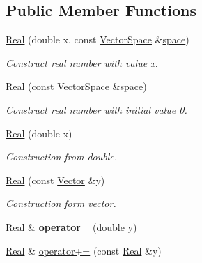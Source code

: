 \subsection*{Public Member Functions}
\begin{DoxyCompactItemize}
\item 
\hyperlink{classSpacy_1_1Real_a7c8581cf79ac0d3ffdc31179d31d8e30}{Real} (double x, const \hyperlink{classSpacy_1_1VectorSpace}{Vector\+Space} \&\hyperlink{classSpacy_1_1VectorBase_aa999dbf9d679d895dfe04c10fbf9f5e9}{space})
\begin{DoxyCompactList}\small\item\em Construct real number with value x. \end{DoxyCompactList}\item 
\hyperlink{classSpacy_1_1Real_a5ae2b93ceddb594b142b3706e4cc9c83}{Real} (const \hyperlink{classSpacy_1_1VectorSpace}{Vector\+Space} \&\hyperlink{classSpacy_1_1VectorBase_aa999dbf9d679d895dfe04c10fbf9f5e9}{space})
\begin{DoxyCompactList}\small\item\em Construct real number with initial value 0. \end{DoxyCompactList}\item 
\hyperlink{classSpacy_1_1Real_ad0f157978475b3c9942a1bcdceb41ab0}{Real} (double x)
\begin{DoxyCompactList}\small\item\em Construction from double. \end{DoxyCompactList}\item 
\hyperlink{classSpacy_1_1Real_a2f9408a9cf34d8119139c73ddda83cc5}{Real} (const \hyperlink{classSpacy_1_1Vector}{Vector} \&y)
\begin{DoxyCompactList}\small\item\em Construction form vector. \end{DoxyCompactList}\item 
\hypertarget{classSpacy_1_1Real_a2c90e84d6c6732b6812d371b7ccf3a18}{}\hyperlink{classSpacy_1_1Real}{Real} \& {\bfseries operator=} (double y)\label{classSpacy_1_1Real_a2c90e84d6c6732b6812d371b7ccf3a18}

\item 
\hypertarget{classSpacy_1_1Real_afe343ccee93f82b75d214c389baee9be}{}\hyperlink{classSpacy_1_1Real}{Real} \& \hyperlink{classSpacy_1_1Real_afe343ccee93f82b75d214c389baee9be}{operator+=} (const \hyperlink{classSpacy_1_1Real}{Real} \&y)\label{classSpacy_1_1Real_afe343ccee93f82b75d214c389baee9be}


\end{DoxyCompactItemize}
